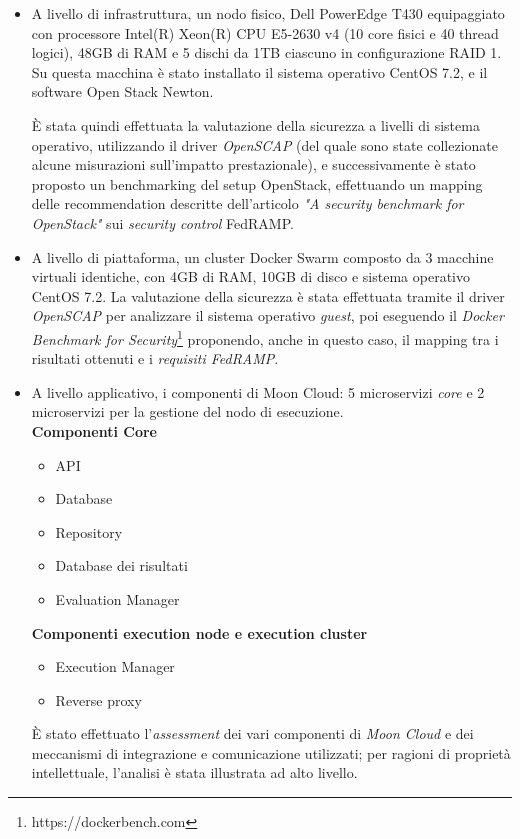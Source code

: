 \documentclass[../main.tex]{subfiles}
\begin{document}
\begin{itemize}
    \item A livello di infrastruttura, un nodo fisico, Dell PowerEdge T430 equipaggiato con processore Intel(R) Xeon(R) CPU E5-2630 v4 (10 core fisici e 40 thread logici), 48GB di RAM e 5 dischi da 1TB ciascuno in configurazione RAID 1. Su questa macchina è stato installato il sistema operativo CentOS 7.2, e il software Open Stack Newton.

        È stata quindi effettuata la valutazione della sicurezza a livelli di sistema operativo, utilizzando il driver \textit{OpenSCAP} (del quale sono state collezionate alcune misurazioni sull'impatto prestazionale), e successivamente è stato proposto un benchmarking del setup OpenStack, effettuando un mapping delle recommendation descritte dell'articolo \textit{"A security benchmark for OpenStack"}\cite{MyPaper} sui \textit{security control} FedRAMP.
    \item A livello di piattaforma, un cluster Docker Swarm composto da 3 macchine virtuali identiche, con 4GB di RAM, 10GB di disco e sistema operativo CentOS 7.2.
        La valutazione della sicurezza è stata effettuata tramite il driver \textit{OpenSCAP} per analizzare il sistema operativo \textit{guest}, poi eseguendo il \textit{Docker Benchmark for Security}\footnote{https://dockerbench.com} proponendo, anche in questo caso, il mapping tra i risultati ottenuti e i \textit{requisiti FedRAMP}.
        \vfill\newpage

    \item A livello applicativo, i componenti di Moon Cloud: 5 microservizi \textit{core} e 2 microservizi per la gestione del nodo di esecuzione.\\
        \textbf{Componenti Core}
        \begin{itemize}
            \item API
            \item Database
            \item Repository
            \item Database dei risultati
            \item Evaluation Manager
        \end{itemize}
        \textbf{Componenti execution node e execution cluster}
        \begin{itemize}
            \item Execution Manager
            \item Reverse proxy
        \end{itemize}

        È stato effettuato l'\textit{assessment} dei vari componenti di \textit{Moon Cloud} e dei meccanismi di integrazione e comunicazione utilizzati; per ragioni di proprietà intellettuale, l'analisi è stata illustrata ad alto livello.
\end{itemize}
\end{document}
